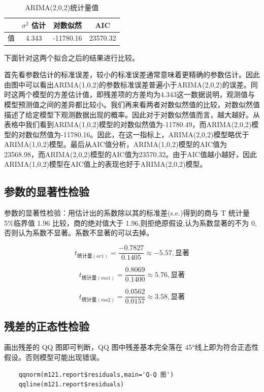\documentclass{article} %
\begin{document}
\begin{table}[H]
    \centering
    \begin{tabular}{lccc} %
    \toprule %
    & $\sigma^2$ 估计 & 对数似然 & AIC \\
    \midrule %
    值 & 4.343 & -11780.16 & 23570.32 \\
    \bottomrule %
    \end{tabular}
    \caption{ARIMA(2,0,2)统计量值}
    \label{tab:statistics-transposed}
\end{table}

下面针对这两个拟合之后的结果进行比较。

首先看参数估计的标准误差，较小的标准误差通常意味着更精确的参数估计。因此由图中可以看出ARIMA(1,0,2)的参数标准误差普遍小于ARIMA(2,0,2)的误差。同时这两个模型的方差估计值，即残差项的方差均为4.343这一数据说明，观测值与模型预测值之间的差异都比较小。我们再来看两者对数似然值的比较，对数似然值描述了给定模型下观测数据出现的概率。因此对于对数似然值而言，越大越好。从表格中我们看到ARIMA(1,0,2)模型的对数似然值为-11780.49，而ARIMA(2,0,2)模型的对数似然值为-11780.16。因此，在这一指标上，ARIMA(2,0,2)模型略优于ARIMA(1,0,2)模型。最后从AIC值分析，ARIMA(1,0,2)模型的AIC值为23568.98，而ARIMA(2,0,2)模型的AIC值为23570.32。由于AIC值越小越好，因此ARIMA(1,0,2)模型在AIC值上的表现也好于ARIMA(2,0,2)模型。


\subsection{参数的显著性检验}
参数的显著性检验：用估计出的系数除以其的标准差(s.e.)得到的商与 T 统计量 5\%临界值 1.96 比较，商的绝对值大于 1.96,则拒绝原假设,认为系数显著的不为 0,否则认为系数不显著。系数不显著的可以去掉。

\[ t_{统计量(ar1)} = \frac{-0.7827}{0.1405} \approx -5.57,\text{显著} \]

\[ t_{统计量(ma1)} = \frac{0.8069}{0.1400} \approx 5.76,\text{显著} \]

\[ t_{统计量(ma2)} = \frac{0.0562}{0.0157} \approx 3.58,\text{显著} \]

\subsection{残差的正态性检验}
画出残差的 QQ 图即可判断，QQ 图中残差基本完全落在 45°线上即为符合正态性假设。否则模型可能出现错误。

\begin{lstlisting}
    qqnorm(m121.report$residuals,main='Q-Q 图')
    qqline(m121.report$residuals)
\end{lstlisting}
\end{document}
